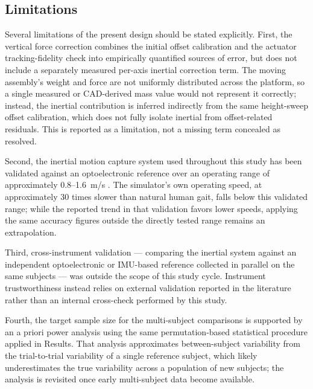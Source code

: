 \documentclass[journal,twocolumn,letterpaper]{IEEEJERM}
\begin{document}
\subsection*{Limitations}

Several limitations of the present design should be stated explicitly.
First, the vertical force correction combines the initial offset
calibration and the actuator tracking-fidelity check into empirically
quantified sources of error, but does not include a separately
measured per-axis inertial correction term. The moving assembly's
weight and force are not uniformly distributed across the platform, so
a single measured or CAD-derived mass value would not represent it
correctly; instead, the inertial contribution is inferred indirectly
from the same height-sweep offset calibration, which does not fully
isolate inertial from offset-related residuals. This is reported as a
limitation, not a missing term concealed as resolved.

Second, the inertial motion capture system used throughout this study
has been validated against an optoelectronic reference over an
operating range of approximately 0.8--1.6~m/s
\cite{Piche2022iSenValidity}. The simulator's own operating speed, at
approximately 30 times slower than natural human gait, falls below
this validated range; while the reported trend in that validation
favors lower speeds, applying the same accuracy figures outside the
directly tested range remains an extrapolation.

Third, cross-instrument validation --- comparing the inertial system
against an independent optoelectronic or IMU-based reference collected
in parallel on the same subjects --- was outside the scope of this
study cycle. Instrument trustworthiness instead relies on external
validation reported in the literature rather than an internal
cross-check performed by this study.

Fourth, the target sample size for the multi-subject comparisons is
supported by an a priori power analysis using the same permutation-based
statistical procedure applied in Results. That analysis approximates
between-subject variability from the trial-to-trial variability of a
single reference subject, which likely underestimates the true
variability across a population of new subjects; the analysis is
revisited once early multi-subject data become available.
\end{document}

